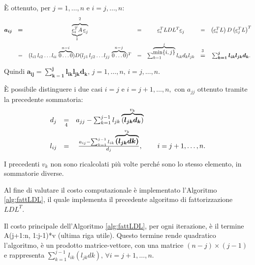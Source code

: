 È ottenuto, per $j=1,\hdots, n$ e $i=j,\hdots, n:$
\begin{equation*}
    \begin{matrix}
        \boldsymbol{a_{ij}}&\boldsymbol =&\overbrace{\underbrace{\uline e_i^TA}_{\footnotemark}\uline e_j}^{\footnotemark} &=&\uline e_i^T LDL^T \uline e_j &=& \left(\uline e_i^T L\right)D\left(\uline e_j^TL\right)^T\\
        &=& (l_{i1}\, l_{i2}\hdots l_{ii}\, \overbrace{0\hdots 0}^{n-i})D (l_{j1}\, l_{j2}\hdots l_{jj}\, \overbrace{0\hdots 0}^{n-j})^T &=& \sum_{k=1}^{\overbrace{\min\{i,j\}}^{j}}l_{ik}d_kl_{jk}&\overset{\footnotemark}{\boldsymbol =}&\boldsymbol{\sum_{k=1}^jl_{ik}l_{jk}d_k}.
    \end{matrix}
\end{equation*}

\addtocounter{footnote}{-2}



Quindi $\boldsymbol{a_{ij}=\sum_{k=1}^jl_{ik}l_{jk}d_k},\,j=1,\hdots, n,\,i=j,\hdots, n.$

È possibile distinguere i due casi $i=j$ e $i=j+1,\hdots, n,$ con $a_{jj}$ ottenuto tramite la precedente sommatoria:
\begin{equation}\label{eq:d_j,l_ij}
    \begin{matrix}
        d_j&\underset{\footnotemark}{=}& a_{jj}-\sum_{k=1}^{j-1}l_{jk}\overbrace{(\boldsymbol{l_{jk}d_k})}^{v_k}\\
        l_{ij}&=& \frac{a_{ij}-\sum_{k=1}^{j-1}l_{ik}\overbrace{\boldsymbol{(l_{jk}dk)}}^{v_k}}{d_j}, && i=j+1,\hdots,n.
    \end{matrix}
\end{equation}


I precedenti $v_k$ non sono ricalcolati più volte perché sono lo stesso elemento, in sommatorie diverse.

Al fine di valutare il costo computazionale è implementato l'Algoritmo \ref{alg:fattLDL}, il quale implementa il precedente algoritmo di fattorizzazione $LDL^T$.

Il costo principale dell'Algoritmo \ref{alg:fattLDL}, per ogni iterazione, è il termine A(j+1:n, 1:j-1)*v (ultima riga utile). Questo termine rende quadratico l'algoritmo, è un prodotto matrice-vettore, con una matrice $(n-j)\times (j-1)$ e rappresenta $\sum_{k=1}^{j-1}l_{ik}\left(l_{jk}dk\right),\, \forall i=j+1,\hdots,n.$

